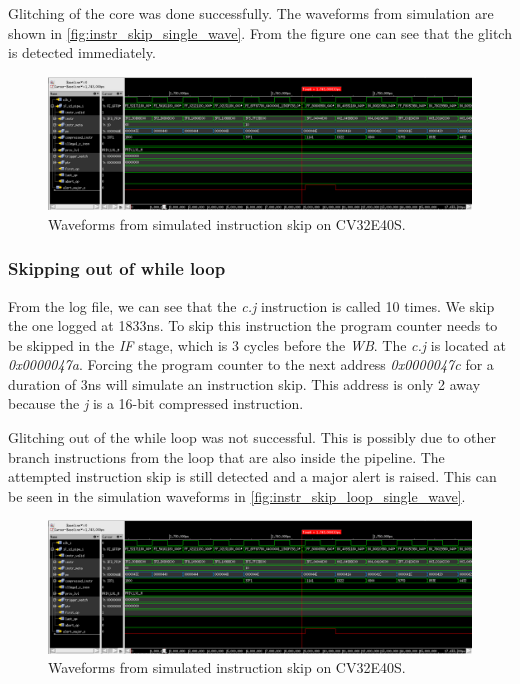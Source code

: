Glitching of the core was done successfully. The waveforms from simulation are shown in \autoref{fig:instr_skip_single_wave}. From the figure one can see that the glitch is detected immediately. 

\begin{figure}[h!]
    \centering
    \includegraphics[width=\textwidth]{docs/images/instr_skip_glitch_injection_single_core.png}
    \caption{Waveforms from simulated instruction skip on CV32E40S.}
    \label{fig:instr_skip_single_wave}
\end{figure}

\subsubsection{Skipping out of while loop}

From the log file, we can see that the \textit{c.j} instruction is called 10 times. We skip the one logged at 1833ns. To skip this instruction the program counter needs to be skipped in the \textit{IF} stage, which is 3 cycles before the \textit{WB}. The \textit{c.j} is located at \textit{0x0000047a}. Forcing the program counter to the next address \textit{0x0000047c} for a duration of 3ns will simulate an instruction skip. This address is only 2 away because the \textit{j} is a 16-bit compressed instruction. 

Glitching out of the while loop was not successful. This is possibly due to other branch instructions from the loop that are also inside the pipeline. The attempted instruction skip is still detected and a major alert is raised. This can be seen in the simulation waveforms in \autoref{fig:instr_skip_loop_single_wave}. 

\begin{figure}[h!]
    \centering
    \includegraphics[width=\textwidth]{docs/images/instr_skip_glitch_injection_single_core.png}
    \caption{Waveforms from simulated instruction skip on CV32E40S.}
    \label{fig:instr_skip_loop_single_wave}
\end{figure}

